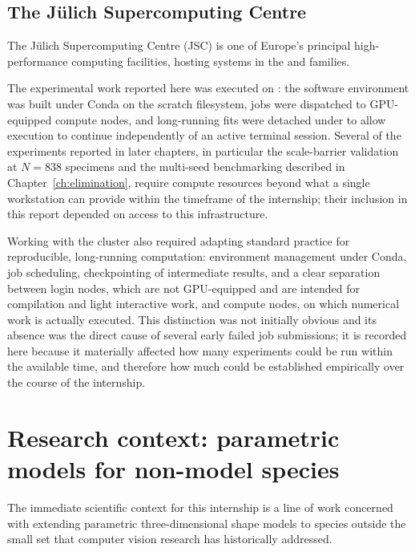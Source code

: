 \subsection{The Jülich Supercomputing Centre}

The Jülich Supercomputing Centre (JSC) is one of Europe's principal
high-performance computing facilities, hosting systems in the  and
 families.

The experimental work reported here was executed on : the software
environment was built under Conda on the scratch filesystem, jobs were
dispatched to GPU-equipped compute nodes, and long-running fits were detached
under  to allow execution to continue independently of an active
terminal session. Several of the experiments reported in later chapters, in
particular the scale-barrier validation at $N=838$ specimens and the
multi-seed benchmarking described in Chapter~\ref{ch:elimination}, require
compute resources beyond what a single workstation can provide within the
timeframe of the internship; their inclusion in this report depended on access
to this infrastructure.

Working with the cluster also required adapting standard practice for
reproducible, long-running computation: environment management under Conda,
job scheduling, checkpointing of intermediate results, and a clear separation
between login nodes, which are not GPU-equipped and are intended for
compilation and light interactive work, and compute nodes, on which numerical
work is actually executed. This distinction was not initially obvious and
its absence was the direct cause of several early failed job submissions; it
is recorded here because it materially affected how many experiments could be
run within the available time, and therefore how much could be established
empirically over the course of the internship.

\section{Research context: parametric models for non-model species}

The immediate scientific context for this internship is a line of work
concerned with extending parametric three-dimensional shape models to species
outside the small set that computer vision research has historically
addressed.

